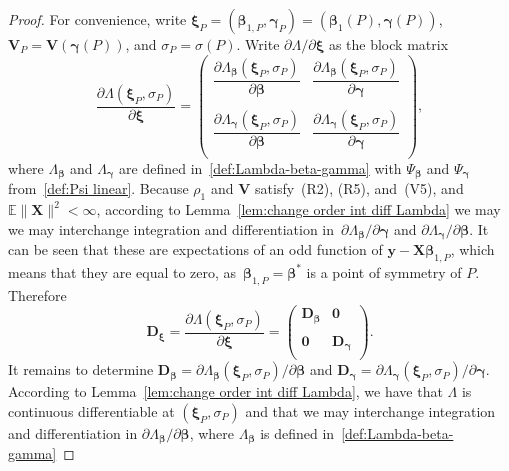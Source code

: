 \documentclass[10pt,a4paper]{amsart}
\newcommand{\E}{\mathbb{E}}
\newcommand{\bD}{\mathbf{D}}
\newcommand{\bV}{\mathbf{V}}
\newcommand{\bX}{\mathbf{X}}
\newcommand{\bbeta}{\bm\beta}
\newcommand{\bgamma}{\bm\gamma}
\newcommand{\bxi}{\bm\xi}
\newcommand{\by}{\mathbf{y}}
\begin{document}
\begin{proof}
For convenience, write $\bxi_P=(\bbeta_{1,P},\bgamma_P)=(\bbeta_1(P),\bgamma(P))$,
$\bV_P=\bV(\bgamma(P))$, and $\sigma_P=\sigma(P)$.
Write $\partial \Lambda/\partial\bxi$ as the block matrix
\begin{equation}
\label{def:Lambda derivative}
\frac{\partial \Lambda(\bxi_P,\sigma_P)}{\partial \bxi}
=
\left(
  \begin{array}{cc}
\dfrac{\partial \Lambda_{\bbeta}(\bxi_P,\sigma_P)}{\partial \bbeta} & \dfrac{\partial \Lambda_{\bbeta}(\bxi_P,\sigma_P)}{\partial \bgamma} \\
    \\
\dfrac{\partial \Lambda_{\bgamma}(\bxi_P,\sigma_P)}{\partial \bbeta} & \dfrac{\partial \Lambda_{\bgamma}(\bxi_P,\sigma_P)}{\partial \bgamma} \\
  \end{array}
\right),
\end{equation}
where $\Lambda_{\bbeta}$ and $\Lambda_{\bgamma}$ are defined in~\eqref{def:Lambda-beta-gamma}
with $\Psi_{\bbeta}$ and $\Psi_{\bgamma}$ from~\eqref{def:Psi linear}.
Because $\rho_1$ and $\bV$ satisfy~(R2), (R5), and~(V5), and $\E\|\bX\|^2<\infty$,
according to Lemma~\ref{lem:change order int diff Lambda} we may
we may interchange integration and differentiation  
in~$\partial\Lambda_{\bbeta}/\partial\bgamma$ and $\partial\Lambda_{\bgamma}/\partial\bbeta$.
It can be seen that these are expectations of an odd function of $\by-\bX\bbeta_{1,P}$,
which means that they are equal to zero, as~$\bbeta_{1,P}=\bbeta^*$ is a point of symmetry of $P$.
Therefore
\begin{equation}
\label{eq:block matrix}
\bD_{\bxi}
=
\frac{\partial \Lambda(\bxi_P,\sigma_P)}{\partial \bxi}
=
\left(
  \begin{array}{cc}
\bD_{\bbeta} & \mathbf{0} \\
    \\
\mathbf{0} & \bD_{\bgamma} \\
  \end{array}
\right).
\end{equation}
It remains to determine $\bD_{\bbeta}=\partial\Lambda_{\bbeta}(\bxi_P,\sigma_P)/\partial\bbeta$
and $\bD_{\bgamma}=\partial\Lambda_{\bgamma}(\bxi_P,\sigma_P)/\partial\bgamma$.
According to Lemma~\ref{lem:change order int diff Lambda}, we have that $\Lambda$ is continuous differentiable at $(\bxi_P,\sigma_P)$ and
that we may interchange
integration and differentiation in $\partial\Lambda_{\bbeta}/\partial\bbeta$, where $\Lambda_{\bbeta}$ is defined in~\eqref{def:Lambda-beta-gamma}

\end{proof}
\end{document}
